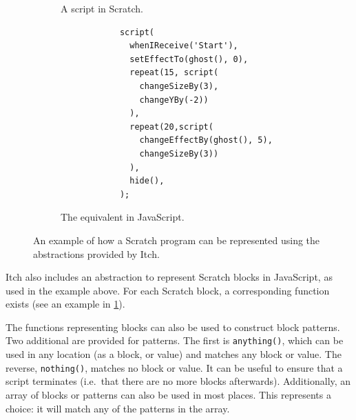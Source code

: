 \documentclass[../main]{subfiles}
\begin{document}
\begin{figure}
    \centering
    \begin{wide}
        \begin{subfigure}{0.49\linewidth}
            \begin{scratch}[scale=0.8]
                {
                }
                {
                }

            \end{scratch}
            \caption{A script in Scratch.}
        \end{subfigure}
        \begin{subfigure}{0.5\linewidth}
            \begin{verbatim}
            script(
              whenIReceive('Start'),
              setEffectTo(ghost(), 0),
              repeat(15, script(
                changeSizeBy(3),
                changeYBy(-2))
              ),
              repeat(20,script(
                changeEffectBy(ghost(), 5),
                changeSizeBy(3))
              ),
              hide(),
            );
            \end{verbatim}
            \caption{The equivalent in JavaScript.}
        \end{subfigure}
    \end{wide}
    \caption{An example of how a Scratch program can be represented using the abstractions provided by Itch.}\label{fig:itch-block-abstraction}
\end{figure}

Itch also includes an abstraction to represent Scratch blocks in JavaScript, as used in the example above.
For each Scratch block, a corresponding function exists (see an example in \cref{fig:itch-block-abstraction}).

The functions representing blocks can also be used to construct block patterns.
Two additional are provided for patterns.
The first is \texttt{anything()}, which can be used in any location (as a block, or value) and matches any block or value.
The reverse, \texttt{nothing()}, matches no block or value.
It can be useful to ensure that a script terminates (i.e.\ that there are no more blocks afterwards).
Additionally, an array of blocks or patterns can also be used in most places.
This represents a choice: it will match any of the patterns in the array.
\end{document}
